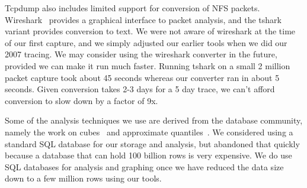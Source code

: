 
Tcpdump also includes limited support for conversion of NFS packets.
Wireshark~\cite{wireshark} provides a graphical interface to packet
analysis, and the tshark variant provides conversion to text.  We were
not aware of wireshark at the time of our first capture, and we simply
adjusted our earlier tools when we did our 2007 tracing.  We may
consider using the wireshark converter in the future, provided we can
make it run much faster.  Running tshark on a small 2 million packet
capture took about 45 seconds whereas our converter ran in about 5
seconds.  Given conversion takes 2-3 days for a 5 day trace, we can't
afford conversion to slow down by a factor of 9x.

Some of the analysis techniques we use are derived from the database
community, namely the work on cubes~\cite{gray97cube} and approximate
quantiles~\cite{Manku98approximatemedians}.  We considered using a
standard SQL database for our storage and analysis, but abandoned that
quickly because a database that can hold 100 billion rows is
very expensive.  We do use SQL databases for analysis and graphing
once we have reduced the data size down to a few million rows using
our tools.




